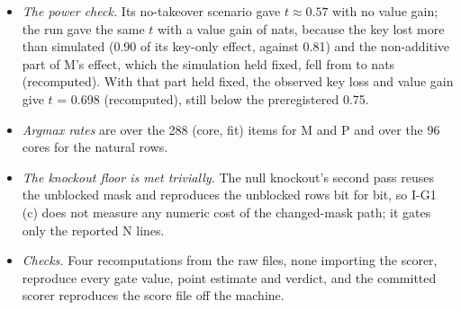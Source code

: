 \begin{itemize}
  \item \emph{The power check.} Its no-takeover scenario gave $t \approx 0.57$ with no value gain; the run gave the same $t$ with a value gain of \IfiveDV{} nats, because the key lost more than simulated (0.90 of its key-only effect, against 0.81) and the non-additive part of M's effect, which the simulation held fixed, fell from \InonAddU{} to \InonAddA{} nats (recomputed). With that part held fixed, the observed key loss and value gain give $t$ = 0.698 (recomputed), still below the preregistered 0.75.
  \item \emph{Argmax rates} are over the 288 (core, fit) items for M and P and over the 96 cores for the natural rows.
  \item \emph{The knockout floor is met trivially.} The null knockout's second pass reuses the unblocked mask and reproduces the unblocked rows bit for bit, so I-G1 (c) does not measure any numeric cost of the changed-mask path; it gates only the reported N lines.
  \item \emph{Checks.} Four recomputations from the raw files, none importing the scorer, reproduce every gate value, point estimate and verdict, and the committed scorer reproduces the score file off the machine.
\end{itemize}

